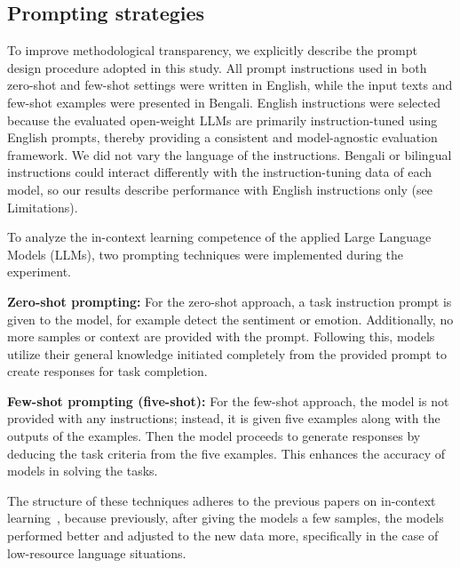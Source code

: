 \documentclass[10pt,letterpaper]{article}
\begin{document}
\subsection*{Prompting strategies}
\label{sec:prompting}


To improve methodological transparency, we explicitly describe the prompt design procedure adopted in this study. All prompt instructions used in both zero-shot and few-shot settings were written in English, while the input texts and few-shot examples were presented in Bengali. English instructions were selected because the evaluated open-weight LLMs are primarily instruction-tuned using English prompts, thereby providing a consistent and model-agnostic evaluation framework. We did not vary the language of the instructions. Bengali or bilingual instructions could interact differently with the instruction-tuning data of each model, so our results describe performance with English instructions only (see Limitations).


To analyze the in-context learning competence of the applied Large Language Models (LLMs), two prompting techniques were implemented during the experiment.  

\textbf{Zero-shot prompting:} For the zero-shot approach, a task instruction prompt is given to the model, for example detect the sentiment or emotion. Additionally, no more samples or context are provided with the prompt. Following this, models utilize their general knowledge initiated completely from the provided prompt to create responses for task completion.  

\textbf{Few-shot prompting (five-shot):} For the few-shot approach, the model is not provided with any instructions; instead, it is given five examples along with the outputs of the examples. Then the model proceeds to generate responses by deducing the task criteria from the five examples. This enhances the accuracy of models in solving the tasks. 

The structure of these techniques adheres to the previous papers on in-context learning~\cite{b35,b43}, because previously, after giving the models a few samples, the models performed better and adjusted to the new data more, specifically in the case of low-resource language situations. 
\end{document}
